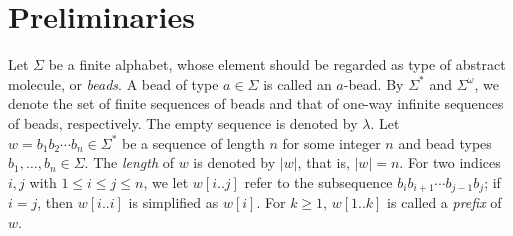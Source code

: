 \documentclass[runningheads]{llncs}
\begin{document}
	\section{Preliminaries}


Let $\Sigma$ be a finite alphabet, whose element should be regarded as type of abstract molecule, or \textit{beads}. 
A bead of type $a \in \Sigma$ is called an $a$-bead. 
By $\Sigma^*$ and $\Sigma^\omega$, we denote the set of finite sequences of beads and that of one-way infinite sequences of beads, respectively. 
The empty sequence is denoted by $\lambda$. 
Let $w = b_1 b_2 \cdots b_n \in \Sigma^*$ be a sequence of length $n$ for some integer $n$ and bead types $b_1, \ldots, b_n \in \Sigma$. 
The \textit{length} of $w$ is denoted by $|w|$, that is, $|w| = n$. %
For two indices $i, j$ with $1 \le i \le j \le n$, we let $w[i..j]$ refer to the subsequence $b_i b_{i+1} \cdots b_{j-1}b_j$; if $i = j$, then $w[i..i]$ is simplified as $w[i]$. 
For $k \ge 1$, $w[1..k]$ is called a \textit{prefix} of $w$. 
\end{document}
